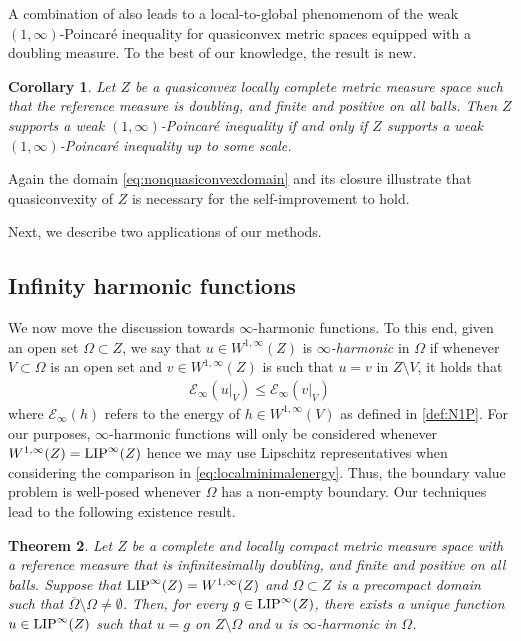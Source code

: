 \documentclass[reqno]{amsart}
\newcommand{\LIP}{{\rm LIP}}
\numberwithin{equation}{section}
\newtheorem{theorem}{Theorem}[section]
\newtheorem{corollary}[theorem]{Corollary}
\theoremstyle{remark}
\begin{document}
A combination of  also leads to a local-to-global phenomenom of the weak $(1,\infty)$-Poincaré inequality for quasiconvex metric spaces equipped with a doubling measure. To the best of our knowledge, the result is new.
\begin{corollary}\label{cor:bounded:doubling:PI}
Let $Z$ be a quasiconvex locally complete metric measure space such that the reference measure is doubling, and finite and positive on all balls. Then $Z$ supports a weak $(1,\infty)$-Poincaré inequality if and only if $Z$ supports a weak $(1,\infty)$-Poincaré inequality up to some scale.
\end{corollary}
Again the domain \eqref{eq:nonquasiconvexdomain} and its closure illustrate that quasiconvexity of $Z$ is necessary for the self-improvement to hold.

Next, we describe two applications of our methods.
%
%
\subsection{Infinity harmonic functions}
We now move the discussion towards $\infty$-harmonic functions. To this end, given an open set $\Omega \subset Z$, we say that $u \in W^{1,\infty}(Z)$ is \emph{$\infty$-harmonic} in $\Omega$ if whenever $V \subset \Omega$ is an open set and $v \in W^{1,\infty}(Z)$ is such that $u = v$ in $Z \setminus V$, it holds that
\begin{align}\label{eq:localminimalenergy}
    \mathscr{E}_{\infty}( u|_{V} ) \leq \mathscr{E}_{\infty}( v|_{V} )
\end{align}
where $\mathscr{E}_{\infty}(h)$ refers to the energy of $h \in W^{1,\infty}(V)$ as defined in \eqref{def:N1P}. For our purposes, $\infty$-harmonic functions will only be considered whenever $W^{1,\infty}(Z)=\LIP^{\infty}(Z)$ hence we may use Lipschitz representatives when considering the comparison in \eqref{eq:localminimalenergy}. Thus, the boundary value problem is well-posed whenever $\Omega$ has a non-empty boundary. Our techniques lead to the following existence result.
\begin{theorem}\label{thm:infty-harmonic-solution}
Let $Z$ be a complete and locally compact metric measure space with a reference measure that is infinitesimally doubling, and finite and positive on all balls. Suppose that $\LIP^{\infty}(Z) = W^{1,\infty}(Z)$ and $\Omega \subset Z$ is a precompact domain such that $\overline{\Omega} \setminus \Omega \neq \emptyset$. Then, for every  $g \in \LIP^{\infty}(Z)$, there exists a unique function $u \in \LIP^{\infty}(Z)$ such that $u=g$ on $ Z \setminus \Omega$ and $u$ is  $\infty$-harmonic in $\Omega$.
\end{theorem}
\end{document}
